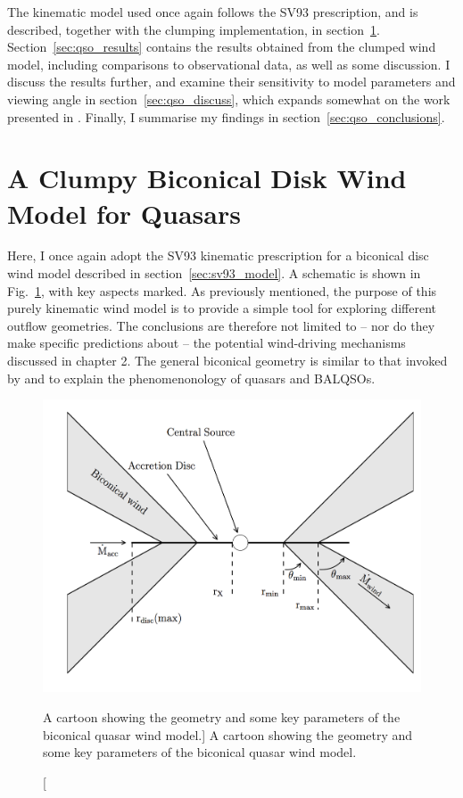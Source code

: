 The kinematic model used once again follows the SV93
prescription, and is described, together with the clumping 
implementation, in section~\ref{sec:clumpy_wind_model}.
Section~\ref{sec:qso_results} contains the results obtained from the clumped wind model, 
including comparisons to observational data, as well as some discussion. 
I discuss the results further, and examine their sensitivity to model parameters
and viewing angle in section~\ref{sec:qso_discuss}, which
expands somewhat on the work presented in \cite{M16}.
Finally, I summarise my findings in section~\ref{sec:qso_conclusions}.

%
%

\section{A Clumpy Biconical Disk Wind Model for Quasars}
\label{sec:clumpy_wind_model}
Here, I once again adopt the SV93 kinematic prescription for a 
biconical disc wind model described in section~\ref{sec:sv93_model}.
A schematic is shown in Fig.~\ref{fig:cartoon_qso},
with key aspects marked. As previously mentioned, the purpose of 
this purely kinematic wind model is to provide a simple tool for 
exploring different outflow geometries. The conclusions are therefore
not limited to -- nor do they make specific predictions about -- the 
potential wind-driving mechanisms discussed in chapter 2. 
The general biconical geometry is similar to that invoked by \cite{MCGV95} and 
\cite{elvis2000} to explain the phenomenonology
of quasars and BALQSOs.

\begin{figure} 
\centering
\includegraphics[width=1.0\textwidth]{figures/06-agnpaper/fig1.png}
\caption
[A cartoon showing the geometry and some key parameters of
the biconical quasar wind model.]
{
A cartoon showing the geometry and some key parameters of
the biconical quasar wind model.
}
\label{fig:cartoon_qso}
\end{figure} 

